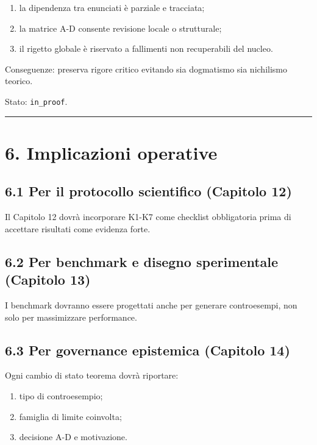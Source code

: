 \begin{enumerate}
\def\labelenumi{\arabic{enumi}.}
\tightlist
\item
  la dipendenza tra enunciati è parziale e tracciata;
\item
  la matrice A-D consente revisione locale o strutturale;
\item
  il rigetto globale è riservato a fallimenti non recuperabili del nucleo.
\end{enumerate}

Conseguenze:
preserva rigore critico evitando sia dogmatismo sia nichilismo teorico.

Stato: \texttt{in\_proof}.

\begin{center}\rule{0.5\linewidth}{0.5pt}\end{center}

\section{6. Implicazioni operative}

\subsection{6.1 Per il protocollo scientifico (Capitolo 12)}

Il Capitolo 12 dovrà incorporare K1-K7 come checklist obbligatoria prima di accettare risultati come evidenza forte.

\subsection{6.2 Per benchmark e disegno sperimentale (Capitolo 13)}

I benchmark dovranno essere progettati anche per generare controesempi, non solo per massimizzare performance.

\subsection{6.3 Per governance epistemica (Capitolo 14)}

Ogni cambio di stato teorema dovrà riportare:

\begin{enumerate}
\def\labelenumi{\arabic{enumi}.}
\tightlist
\item
  tipo di controesempio;
\item
  famiglia di limite coinvolta;
\item
  decisione A-D e motivazione.
\end{enumerate}

